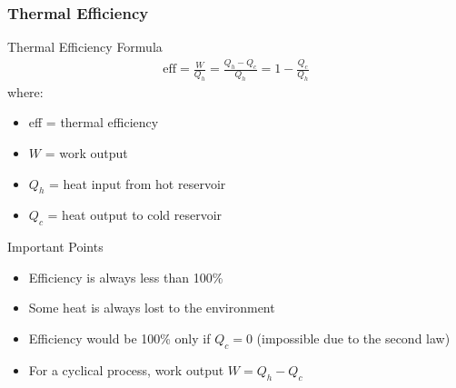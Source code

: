 \documentclass{beamer}
\begin{document}
\begin{frame}
    \frametitle{Thermal Efficiency}
    \begin{alertblock}{Thermal Efficiency Formula}
        \begin{align*}
            \text{eff} = \frac{W}{Q_h} = \frac{Q_h - Q_c}{Q_h} = 1 - \frac{Q_c}{Q_h}
        \end{align*}
        where:
        \begin{itemize}
            \item eff = thermal efficiency
            \item $W$ = work output
            \item $Q_h$ = heat input from hot reservoir
            \item $Q_c$ = heat output to cold reservoir
        \end{itemize}
    \end{alertblock}
    \end{frame}

\begin{frame}
    \begin{block}{Important Points}
        \begin{itemize}
            \item Efficiency is always less than 100\%
            \item Some heat is always lost to the environment
            \item Efficiency would be 100\% only if $Q_c = 0$ (impossible due to the second law)
            \item For a cyclical process, work output $W = Q_h - Q_c$
        \end{itemize}
    \end{block}
\end{frame}
\end{document}
